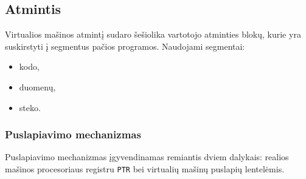 \documentclass{scrartcl}
\begin{document}
        \subsection{Atmintis}
            Virtualios mašinos atmintį sudaro šešiolika vartotojo atminties blokų, kurie yra suskirstyti į segmentus pačios programos. Naudojami segmentai:
            \begin{itemize}
                \item kodo,
                \item duomenų,
                \item steko.
            \end{itemize}
            \subsubsection{Puslapiavimo mechanizmas}
                Puslapiavimo mechanizmas įgyvendinamas remiantis dviem dalykais: realios mašinos procesoriaus registru \texttt{PTR} bei virtualių mašinų puslapių lentelėmis.
\end{document}
